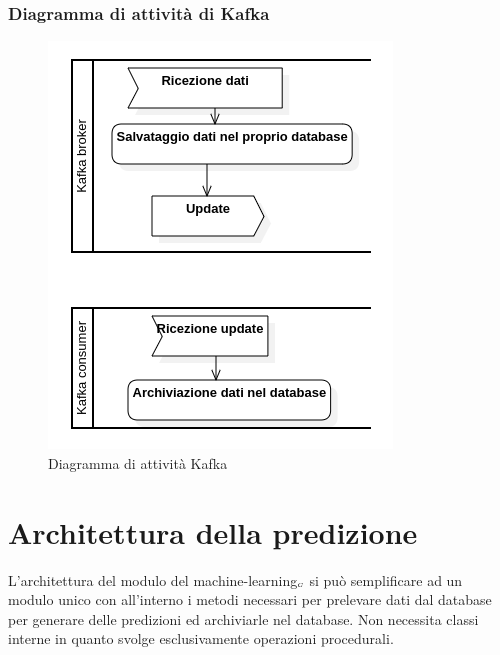 \subsubsection{Diagramma di attività di Kafka}\label{DiagrammaDiKafka}
\begin{center}
	\begin{figure}[H]
		\centering\includegraphics[scale=0.8]
    {../immagini/diag_PB/kafka.png}
		\caption{Diagramma di attività Kafka}
	\end{figure}
\end{center}


\section{Architettura della predizione}\label{ArchitetturaDelProdottoPrediction}
L'architettura del modulo del machine-learning$_{\scaleto{G}{3pt}}$ si può semplificare ad un modulo unico con all'interno i metodi necessari per prelevare dati dal database per generare delle predizioni ed archiviarle nel database.
Non necessita classi interne in quanto svolge esclusivamente operazioni procedurali. 
